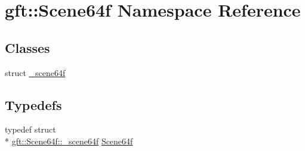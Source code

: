\hypertarget{namespacegft_1_1Scene64f}{\section{gft\-:\-:Scene64f Namespace Reference}
\label{namespacegft_1_1Scene64f}
}
\subsection*{Classes}
\begin{DoxyCompactItemize}
\item 
struct \hyperlink{structgft_1_1Scene64f_1_1__scene64f}{\-\_\-scene64f}
\end{DoxyCompactItemize}
\subsection*{Typedefs}
\begin{DoxyCompactItemize}
\item 
typedef struct \\*
\hyperlink{structgft_1_1Scene64f_1_1__scene64f}{gft\-::\-Scene64f\-::\-\_\-scene64f} \hyperlink{namespacegft_1_1Scene64f_a512a42827b5e024a75792dd3e6fca5eb}{Scene64f}
\end{DoxyCompactItemize}
